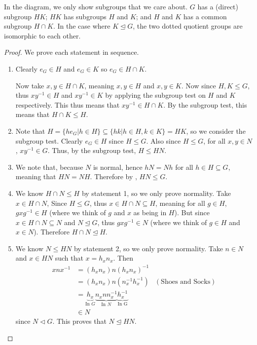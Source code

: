 In the diagram, we only show subgroups that we care about. $G$ has a (direct) subgroup $HK$; $HK$ has subgroups $H$ and $K$; and $H$ and $K$ has a common subgroup $H\cap K$. In the case where $K \unlhd G$, the two dotted quotient groups are isomorphic to each other.

\begin{proof}
    We prove each statement in sequence.

    \begin{enumerate}
        \item Clearly $e_G \in H$ and $e_G \in K$ so $e_G \in H \cap K$.
        
        Now take $x, y \in H \cap K$, meaning $x, y \in H$ and $x, y \in K$. Now since $H, K \leq G$, thus $xy^{-1} \in H$ and $xy^{-1} \in K$ by applying the subgroup test on $H$ and $K$ respectively. This thus means that $xy^{-1} \in H \cap K$. By the subgroup test, this means that $H \cap K \leq H$.
        
        \item Note that $H = \{he_G \vert h \in H\} \subseteq \{hk \vert h \in H, k \in K\} = HK$, so we consider the subgroup test. Clearly $e_G \in H$ since $H \leq G$. Also since $H \leq G$, for all $x, y \in N$, $xy^{-1} \in G$. Thus, by the subgroup test, $H \leq HN$.
        
        \item We note that, because $N$ is normal, hence $hN = Nh$ for all $h \in H \subseteq G$, meaning that $HN = NH$. Therefore by , $HN \leq G$.

        \item We know $H \cap N \leq H$ by statement 1, so we only prove normality. Take $x \in H \cap N$, Since $H \leq G$, thus $x \in H \cap N \subseteq H$, meaning for all $g \in H$, $gxg^{-1} \in H$ (where we think of $g$ and $x$ as being in $H$). But since $x \in H \cap N \subseteq N$ and $N \unlhd G$, thus $gxg^{-1} \in N$ (where we think of $g \in H$ and $x \in N$). Therefore $H \cap N \unlhd H$.

        \item We know $N \leq HN$ by statement 2, so we only prove normality. Take $n \in N$ and $x \in HN$ such that $x = h_xn_x$. Then
        \begin{align*}
            xnx^{-1} &= (h_xn_x)n(h_xn_x)^{-1}\\
            &= (h_xn_x)n(n_x^{-1}h_x^{-1}) & (\text{Shoes and Socks})\\
            &= \underbrace{h_x}_{\text{In }G}\underbrace{n_xnn_x^{-1}}_{\text{In }N}\underbrace{h_x^{-1}}_{\text{In G}}\\
            &\in N
        \end{align*}
        since $N \lhd G$. This proves that $N \unlhd HN$.


\end{enumerate}
\end{proof}
